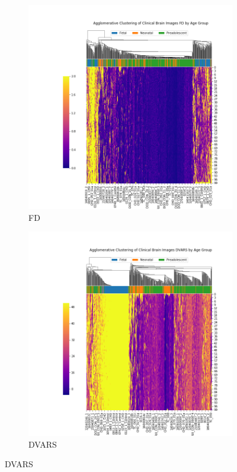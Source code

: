 \begin{figure}[t]
	\centering
	\begin{subfigure}{0.49\textwidth}
		\centering
		\includegraphics[width=1.0\textwidth]{6/figures/agegroup-bold-fd-sns-agg.png}
		\caption{FD}
	\end{subfigure}
	\begin{subfigure}{0.49\textwidth}
		\centering
		\includegraphics[width=1.0\textwidth]{6/figures/agegroup-bold-dvars-sns-agg.png}
		\caption{DVARS}
	\end{subfigure}
	

\end{figure}
